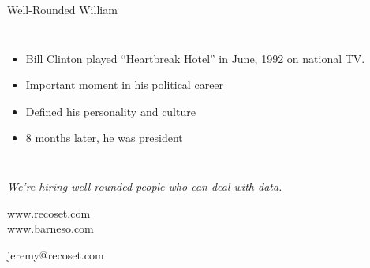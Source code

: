 \documentclass{beamer}
\begin{document}
\begin{frame}{Well-Rounded William}

\begin{columns}

  \begin{itemize}
  \item Bill Clinton played ``Heartbreak Hotel'' in June, 1992 on national TV.
  \item Important moment in his political career
  \item Defined his \alert{personality} and \alert{culture}
  \item 8 months later, he was president
  \end{itemize}

\end{columns}

\end{frame}

\begin{frame}

  \begin{center}
  \textit{We're hiring \alert{well rounded} people who can deal with data.}

  \vskip 1cm

  www.recoset.com \\
  www.barneso.com

  \vskip 1cm

  jeremy@recoset.com

\end{center}

\end{frame}
\end{document}
